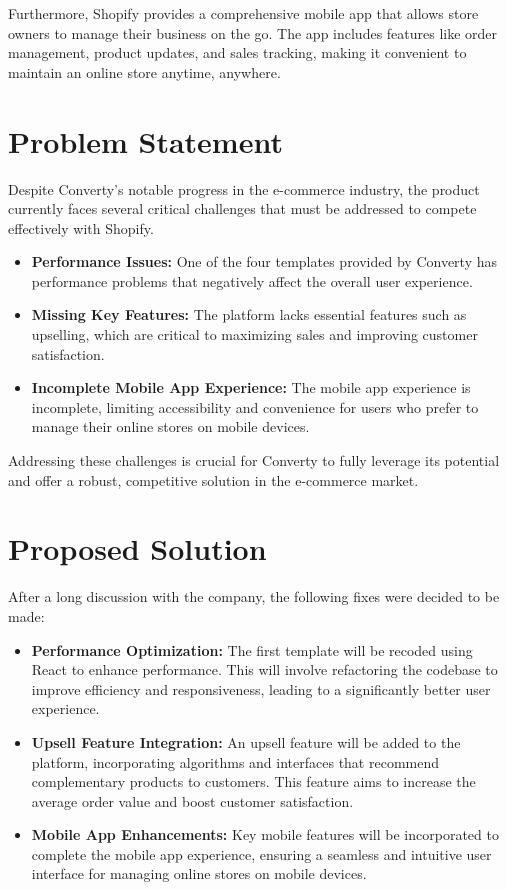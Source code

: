 Furthermore, Shopify provides a comprehensive mobile app that allows store owners to manage their business on the go. The app includes features like order management, product updates, and sales tracking, making it convenient to maintain an online store anytime, anywhere.

\section{Problem Statement} 
Despite Converty's notable progress in the e-commerce industry, the product currently faces several critical challenges that must be addressed to compete effectively with Shopify. 
\begin{itemize} 
    \item \textbf{Performance Issues:} One of the four templates provided by Converty has performance problems that negatively affect the overall user experience. 
    \item \textbf{Missing Key Features:} The platform lacks essential features such as upselling, which are critical to maximizing sales and improving customer satisfaction. 
    \item \textbf{Incomplete Mobile App Experience:} The mobile app experience is incomplete, limiting accessibility and convenience for users who prefer to manage their online stores on mobile devices. 
\end{itemize} 
Addressing these challenges is crucial for Converty to fully leverage its potential and offer a robust, competitive solution in the e-commerce market.

\section{Proposed Solution}
After a long discussion with the company, the following fixes were decided to be made:

\begin{itemize}
  \item \textbf{Performance Optimization:} The first template will be recoded using React to enhance performance. This will involve refactoring the codebase to improve efficiency and responsiveness, leading to a significantly better user experience.
  \item \textbf{Upsell Feature Integration:} An upsell feature will be added to the platform, incorporating algorithms and interfaces that recommend complementary products to customers. This feature aims to increase the average order value and boost customer satisfaction.
  \item \textbf{Mobile App Enhancements:} Key mobile features will be incorporated to complete the mobile app experience, ensuring a seamless and intuitive user interface for managing online stores on mobile devices.
\end{itemize}


